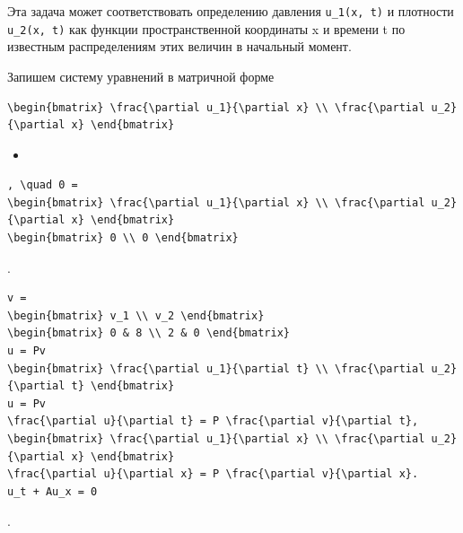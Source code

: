 \documentclass[
  ukrainian,
]{article}
\providecommand{\tightlist}{%
  \setlength{\itemsep}{0pt}\setlength{\parskip}{0pt}}
\begin{document}
Эта задача может соответствовать определению давления
\texttt{u\_1(x,\ t)} и плотности \texttt{u\_2(x,\ t)} как функции
пространственной координаты x и времени t по известным распределениям
этих величин в начальный момент.

Запишем систему уравнений в матричной форме

\begin{verbatim}
\begin{bmatrix} \frac{\partial u_1}{\partial x} \\ \frac{\partial u_2}{\partial x} \end{bmatrix}
\end{verbatim}

\begin{itemize}
\tightlist
\item
\end{itemize}

\begin{verbatim}
, \quad 0 =
\begin{bmatrix} \frac{\partial u_1}{\partial x} \\ \frac{\partial u_2}{\partial x} \end{bmatrix}
\begin{bmatrix} 0 \\ 0 \end{bmatrix}
\end{verbatim}

.

\begin{verbatim}
v =
\begin{bmatrix} v_1 \\ v_2 \end{bmatrix}
\begin{bmatrix} 0 & 8 \\ 2 & 0 \end{bmatrix}
u = Pv
\begin{bmatrix} \frac{\partial u_1}{\partial t} \\ \frac{\partial u_2}{\partial t} \end{bmatrix}
u = Pv
\frac{\partial u}{\partial t} = P \frac{\partial v}{\partial t},
\begin{bmatrix} \frac{\partial u_1}{\partial x} \\ \frac{\partial u_2}{\partial x} \end{bmatrix}
\frac{\partial u}{\partial x} = P \frac{\partial v}{\partial x}.
u_t + Au_x = 0
\end{verbatim}

.
\end{document}
